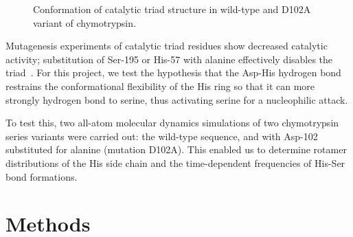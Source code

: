 \documentclass[11pt, twocolumn]{article}
\begin{document}
\begin{figure}[H]

    \caption{Conformation of catalytic triad structure in wild-type and D102A
    variant of chymotrypsin.}\label{fig:triad}
\end{figure}

Mutagenesis experiments of catalytic
triad residues show decreased catalytic activity; substitution of Ser-195 or
His-57 with alanine effectively disables the triad~\cite{hedstrom02}. For
this project, we test the hypothesis that the Asp-His hydrogen bond restrains
the conformational flexibility of the His ring so that it can more strongly
hydrogen bond to serine, thus activating serine for a nucleophilic attack.

To test this, two all-atom molecular dynamics simulations of two chymotrypsin
series variants were carried out: the wild-type sequence, and with Asp-102
substituted for alanine (mutation D102A). This enabled us to determine rotamer
distributions of the His side chain and the time-dependent frequencies of
His-Ser bond formations.

\section{Methods}
\end{document}
